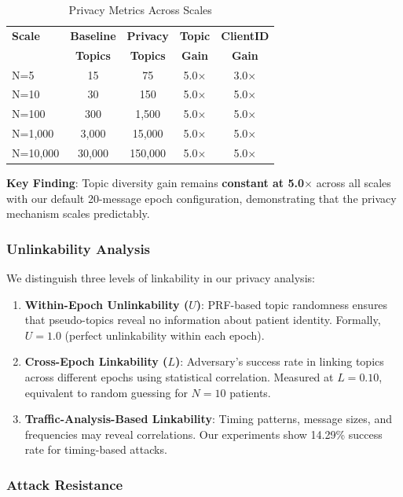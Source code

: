 \documentclass[conference]{IEEEtran}
\begin{document}
\begin{table}[htbp]
\caption{Privacy Metrics Across Scales}
\label{tab:privacy}
\centering
\begin{tabular}{lcccc}
\toprule
\textbf{Scale} & \textbf{Baseline} & \textbf{Privacy} & \textbf{Topic} & \textbf{ClientID} \\
 & \textbf{Topics} & \textbf{Topics} & \textbf{Gain} & \textbf{Gain} \\
\midrule
N=5 & 15 & 75 & 5.0$\times$ & 3.0$\times$ \\
N=10 & 30 & 150 & 5.0$\times$ & 5.0$\times$ \\
N=100 & 300 & 1,500 & 5.0$\times$ & 5.0$\times$ \\
N=1,000 & 3,000 & 15,000 & 5.0$\times$ & 5.0$\times$ \\
N=10,000 & 30,000 & 150,000 & 5.0$\times$ & 5.0$\times$ \\
\bottomrule
\end{tabular}
\end{table}

\textbf{Key Finding}: Topic diversity gain remains \textbf{constant at 5.0$\times$} across all scales with our default 20-message epoch configuration, demonstrating that the privacy mechanism scales predictably.

\subsubsection{Unlinkability Analysis}

We distinguish three levels of linkability in our privacy analysis:

\begin{enumerate}
    \item \textbf{Within-Epoch Unlinkability ($U$)}: PRF-based topic randomness ensures that pseudo-topics reveal no information about patient identity. Formally, $U = 1.0$ (perfect unlinkability within each epoch).
    \item \textbf{Cross-Epoch Linkability ($L$)}: Adversary's success rate in linking topics across different epochs using statistical correlation. Measured at $L = 0.10$, equivalent to random guessing for $N=10$ patients.
    \item \textbf{Traffic-Analysis-Based Linkability}: Timing patterns, message sizes, and frequencies may reveal correlations. Our experiments show 14.29\% success rate for timing-based attacks.
\end{enumerate}

\subsubsection{Attack Resistance}
\end{document}
